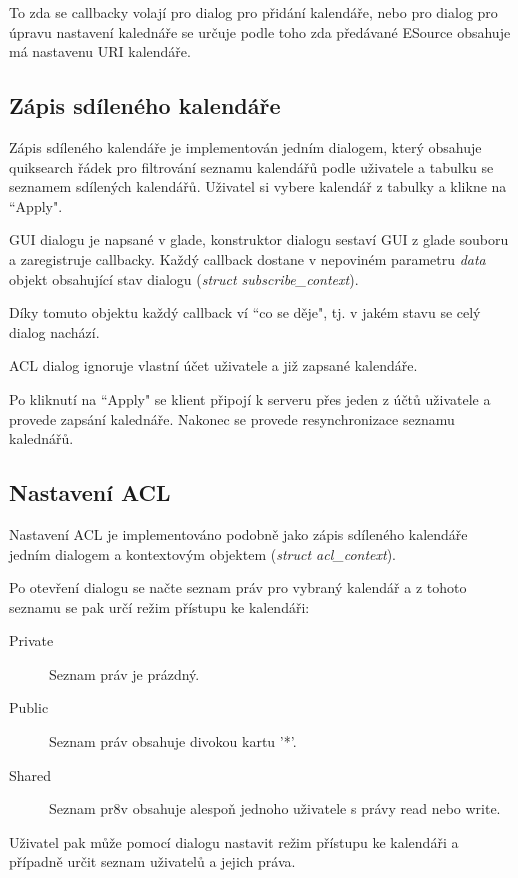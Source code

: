 \documentclass[a4paper,10pt]{article}
\begin{document}
\begin{multicols*}{2}
To zda se callbacky volají pro dialog pro přidání kalendáře, nebo pro dialog pro
úpravu nastavení kalednáře se určuje podle toho zda předávané ESource obsahuje
má nastavenu URI kalendáře.

\subsection{Zápis sdíleného kalendáře}

Zápis sdíleného kalendáře je implementován jedním dialogem, který obsahuje
quiksearch řádek pro filtrování seznamu kalendářů podle uživatele a tabulku se
seznamem sdílených kalendářů. Uživatel si vybere kalendář z tabulky a klikne na
``Apply".

GUI dialogu je napsané v glade, konstruktor dialogu sestaví GUI z glade souboru
a zaregistruje callbacky. Každý callback dostane v nepoviném parametru
\textit{data} objekt obsahující stav dialogu (\textit{struct subscribe\_context}).

Díky tomuto objektu každý callback ví ``co se děje", tj. v jakém stavu se celý
dialog nachází.

ACL dialog ignoruje vlastní účet uživatele a již zapsané kalendáře.

Po kliknutí na ``Apply" se klient připojí k serveru přes jeden z účtů uživatele
a provede zapsání kalednáře. Nakonec se provede resynchronizace seznamu
kalednářů.

\subsection{Nastavení ACL}

Nastavení ACL je implementováno podobně jako zápis sdíleného kalendáře jedním
dialogem a kontextovým objektem (\textit{struct acl\_context}).

Po otevření dialogu se načte seznam práv pro vybraný kalendář a z tohoto seznamu
se pak určí režim přístupu ke kalendáři:
\begin{description}
\item [Private] Seznam práv je prázdný.
\item [Public] Seznam práv obsahuje divokou kartu '*'.
\item [Shared] Seznam pr8v obsahuje alespoň jednoho uživatele s právy read nebo
write.
\end{description}

Uživatel pak může pomocí dialogu nastavit režim přístupu ke kalendáři a případně
určit seznam uživatelů a jejich práva.


\end{multicols*}
\end{document}

